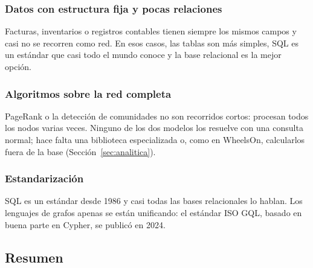 \documentclass[11pt, a4paper]{article}
\begin{document}
\subsubsection{Datos con estructura fija y pocas relaciones}
Facturas, inventarios o registros contables tienen siempre los mismos campos y casi no
se recorren como red. En esos casos, las tablas son más simples, SQL es un estándar que
casi todo el mundo conoce y la base relacional es la mejor opción.

\subsubsection{Algoritmos sobre la red completa}
PageRank o la detección de comunidades no son recorridos cortos: procesan todos los
nodos varias veces. Ninguno de los dos modelos los resuelve con una consulta normal;
hace falta una biblioteca especializada o, como en WheelsOn, calcularlos fuera de la
base (Sección~\ref{sec:analitica}).

\subsubsection{Estandarización}
SQL es un estándar desde 1986 y casi todas las bases relacionales lo hablan. Los
lenguajes de grafos apenas se están unificando: el estándar ISO GQL, basado en buena
parte en Cypher, se publicó en 2024.

\subsection{Resumen}
\end{document}
